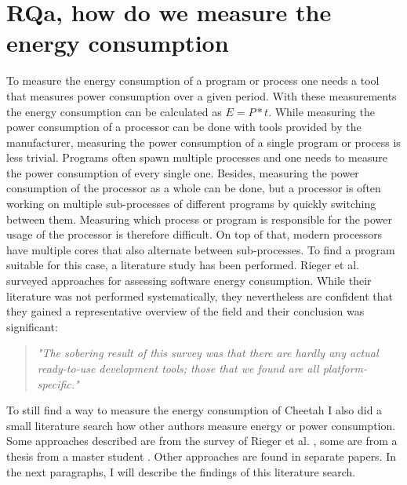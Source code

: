 \documentclass[../thesis.tex]{subfiles}
\begin{document}
\section{RQa, how do we measure the energy consumption}
\label{section:rqa}To measure the energy consumption of a program or process one needs a tool that measures power consumption over a given period. With these measurements the energy consumption can be calculated as $E=P*t$. While measuring the power consumption of a processor can be done with tools provided by the manufacturer, measuring the power consumption of a single program or process is less trivial. Programs often spawn multiple processes and one needs to measure the power consumption of every single one.  Besides, measuring the power consumption of the processor as a whole can be done, but a processor is often working on multiple sub-processes of different programs by quickly switching between them. Measuring which process or program is responsible for the power usage of the processor is therefore difficult. On top of that, modern processors have multiple cores that also alternate between sub-processes. To find a program suitable for this case, a literature study has been performed. Rieger et al. \citeyearpar{rieger2017} surveyed approaches for assessing software energy consumption. While their literature was not performed systematically\parencite[p. 24]{rieger2017}, they nevertheless are confident that they gained a representative overview of the field and their conclusion was significant:

\begin{quote}
    \emph{"The sobering result of this survey was that there are hardly any actual ready-to-use development tools; those that we found are all platform-specific."} \parencite[p. 24]{rieger2017}
\end{quote}

To still find a way to measure the energy consumption of Cheetah I also did a small literature search how other authors measure energy or power consumption. Some approaches described are from the survey of Rieger et al. \citeyearpar{rieger2017}, some are from a thesis from a master student \parencite{strempel2021}. Other approaches are found in separate papers. In the next paragraphs, I will describe the findings of this literature search.\paragraph{}
\end{document}
